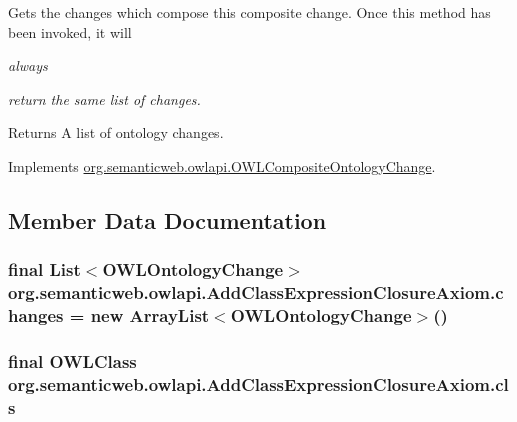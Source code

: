 Gets the changes which compose this composite change. Once this method has been invoked, it will {\itshape always{\itshape  return the same list of changes. \begin{DoxyReturn}{Returns}
A list of ontology changes. 
\end{DoxyReturn}
}}

Implements \hyperlink{interfaceorg_1_1semanticweb_1_1owlapi_1_1_o_w_l_composite_ontology_change_a047d3f540ac840c0ac0285bc576636d2}{org.\-semanticweb.\-owlapi.\-O\-W\-L\-Composite\-Ontology\-Change}.



\subsection{Member Data Documentation}
\hypertarget{classorg_1_1semanticweb_1_1owlapi_1_1_add_class_expression_closure_axiom_a7bb7bb024c943d8eb0bdad8284ec0af5}{
\subsubsection[{changes}]{\setlength{\rightskip}{0pt plus 5cm}final List$<${\bf O\-W\-L\-Ontology\-Change}$>$ org.\-semanticweb.\-owlapi.\-Add\-Class\-Expression\-Closure\-Axiom.\-changes = new Array\-List$<${\bf O\-W\-L\-Ontology\-Change}$>$()\hspace{0.3cm}{\ttfamily [private]}}}\label{classorg_1_1semanticweb_1_1owlapi_1_1_add_class_expression_closure_axiom_a7bb7bb024c943d8eb0bdad8284ec0af5}
\hypertarget{classorg_1_1semanticweb_1_1owlapi_1_1_add_class_expression_closure_axiom_a5cec1d39c2c4f63bcb62a259e9b03163}{
\subsubsection[{cls}]{\setlength{\rightskip}{0pt plus 5cm}final {\bf O\-W\-L\-Class} org.\-semanticweb.\-owlapi.\-Add\-Class\-Expression\-Closure\-Axiom.\-cls\hspace{0.3cm}{\ttfamily [private]}}}\label{classorg_1_1semanticweb_1_1owlapi_1_1_add_class_expression_closure_axiom_a5cec1d39c2c4f63bcb62a259e9b03163}
